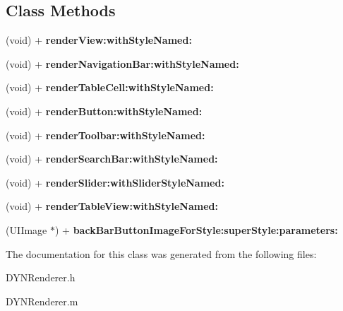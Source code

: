 \subsection*{Class Methods}
\begin{DoxyCompactItemize}
\item 
\hypertarget{interface_d_y_n_renderer_ad05376a56622c704351243d815f5c6fe}{(void) + {\bfseries render\-View\-:with\-Style\-Named\-:}}\label{interface_d_y_n_renderer_ad05376a56622c704351243d815f5c6fe}

\item 
\hypertarget{interface_d_y_n_renderer_ab3b090bb49696c476df175ba1184f886}{(void) + {\bfseries render\-Navigation\-Bar\-:with\-Style\-Named\-:}}\label{interface_d_y_n_renderer_ab3b090bb49696c476df175ba1184f886}

\item 
\hypertarget{interface_d_y_n_renderer_af844a9f7013f543f1aed993105e40276}{(void) + {\bfseries render\-Table\-Cell\-:with\-Style\-Named\-:}}\label{interface_d_y_n_renderer_af844a9f7013f543f1aed993105e40276}

\item 
\hypertarget{interface_d_y_n_renderer_a721bf70d3cf643a34b40e9a21534fab9}{(void) + {\bfseries render\-Button\-:with\-Style\-Named\-:}}\label{interface_d_y_n_renderer_a721bf70d3cf643a34b40e9a21534fab9}

\item 
\hypertarget{interface_d_y_n_renderer_af556c61d11cb9ba7a34f7564b5260691}{(void) + {\bfseries render\-Toolbar\-:with\-Style\-Named\-:}}\label{interface_d_y_n_renderer_af556c61d11cb9ba7a34f7564b5260691}

\item 
\hypertarget{interface_d_y_n_renderer_a15bbeda8bff160b5d25be6f2d5c033a6}{(void) + {\bfseries render\-Search\-Bar\-:with\-Style\-Named\-:}}\label{interface_d_y_n_renderer_a15bbeda8bff160b5d25be6f2d5c033a6}

\item 
\hypertarget{interface_d_y_n_renderer_a4b7caf29c5d1816abca0a0fdc9394e66}{(void) + {\bfseries render\-Slider\-:with\-Slider\-Style\-Named\-:}}\label{interface_d_y_n_renderer_a4b7caf29c5d1816abca0a0fdc9394e66}

\item 
\hypertarget{interface_d_y_n_renderer_ad879fcacc66144c58b8e1683efaa1c83}{(void) + {\bfseries render\-Table\-View\-:with\-Style\-Named\-:}}\label{interface_d_y_n_renderer_ad879fcacc66144c58b8e1683efaa1c83}

\item 
\hypertarget{interface_d_y_n_renderer_acca99695efdae74ffcfc93e3c0ea77e8}{(U\-I\-Image $\ast$) + {\bfseries back\-Bar\-Button\-Image\-For\-Style\-:super\-Style\-:parameters\-:}}\label{interface_d_y_n_renderer_acca99695efdae74ffcfc93e3c0ea77e8}

\end{DoxyCompactItemize}


The documentation for this class was generated from the following files\-:\begin{DoxyCompactItemize}
\item 
D\-Y\-N\-Renderer.\-h\item 
D\-Y\-N\-Renderer.\-m\end{DoxyCompactItemize}
